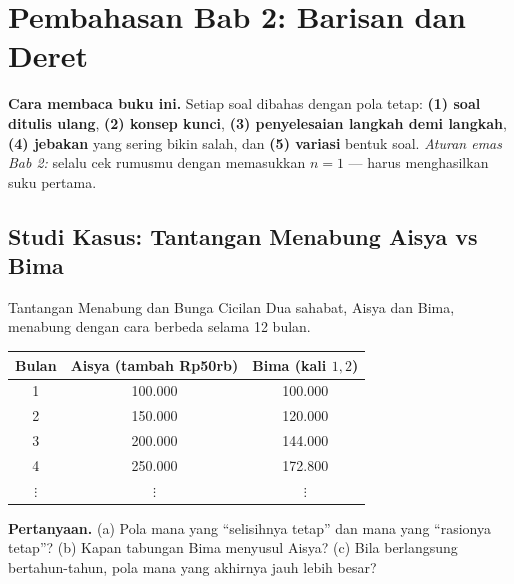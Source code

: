 
\renewcommand{\babjudul}{Pembahasan Latihan — Bab 2}


\setcounter{chapter}{2}

\chapter*{Pembahasan Bab 2: Barisan dan Deret}

\begin{tips}
\textbf{Cara membaca buku ini.} Setiap soal dibahas dengan pola tetap:
\textbf{(1) soal ditulis ulang}, \textbf{(2) konsep kunci}, \textbf{(3)
penyelesaian langkah demi langkah}, \textbf{(4) jebakan} yang sering bikin salah,
dan \textbf{(5) variasi} bentuk soal. \emph{Aturan emas Bab 2:} selalu cek
rumusmu dengan memasukkan $n=1$ --- harus menghasilkan suku pertama.
\end{tips}

\section*{Studi Kasus: Tantangan Menabung Aisya vs Bima}

\begin{studikasus}{Tantangan Menabung dan Bunga Cicilan}
Dua sahabat, Aisya dan Bima, menabung dengan cara berbeda selama 12 bulan.
\begin{center}
\begin{tabular}{c|c|c}
\toprule
Bulan & Aisya (tambah Rp50rb) & Bima (kali $1{,}2$) \\
\midrule
1 & 100.000 & 100.000 \\
2 & 150.000 & 120.000 \\
3 & 200.000 & 144.000 \\
4 & 250.000 & 172.800 \\
$\vdots$ & $\vdots$ & $\vdots$ \\
\bottomrule
\end{tabular}
\end{center}
\textbf{Pertanyaan.} (a) Pola mana yang ``selisihnya tetap'' dan mana yang
``rasionya tetap''? (b) Kapan tabungan Bima menyusul Aisya? (c) Bila berlangsung
bertahun-tahun, pola mana yang akhirnya jauh lebih besar?
\end{studikasus}

